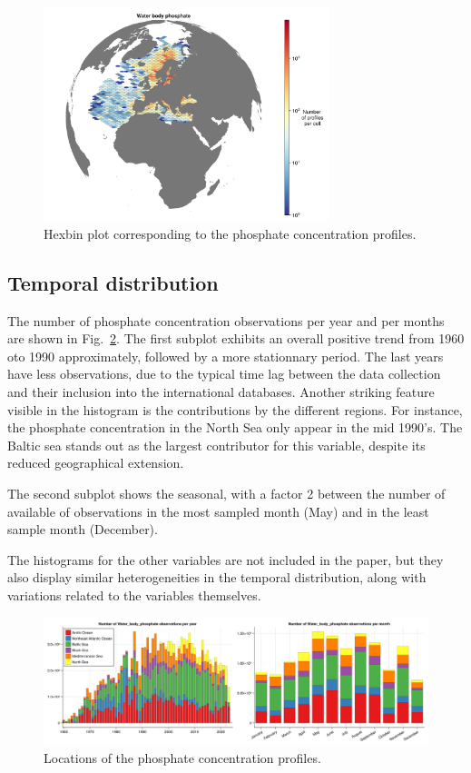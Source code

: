\documentclass[essd, manuscript]{copernicus}
\begin{document}
\begin{figure}[t]
\includegraphics[width=8.3cm]{observations_Water_body_phosphate_hex.png}
\caption{Hexbin plot corresponding to the phosphate concentration profiles.\label{fig:phosphatedatahexbin}}
\end{figure}

\subsection{Temporal distribution}

The number of phosphate concentration observations per year and per months are shown in Fig.~\ref{fig:phosphatetime}. The first subplot exhibits an overall positive trend from 1960 oto 1990 approximately, followed by a more stationnary period. The last years have less observations, due to the typical time lag between the data collection and their inclusion into the international databases. Another striking feature visible in the histogram is the contributions by the different regions. For instance, the phosphate concentration in the North Sea only appear in the mid 1990's. The Baltic sea stands out as the largest contributor for this variable, despite its reduced geographical extension.

The second subplot shows the seasonal, with a factor 2 between the number of available of observations in the most sampled month (May) and in the least sample month (December). 

The histograms for the other variables are not included in the paper, but they also display similar heterogeneities in the temporal distribution, along with variations related to the variables themselves. 

\begin{figure}[t]
\includegraphics[width=\textwidth]{stacked_histogram_Water_body_phosphate.png}
\caption{Locations of the phosphate concentration profiles.\label{fig:phosphatetime}}
\end{figure}
\end{document}
